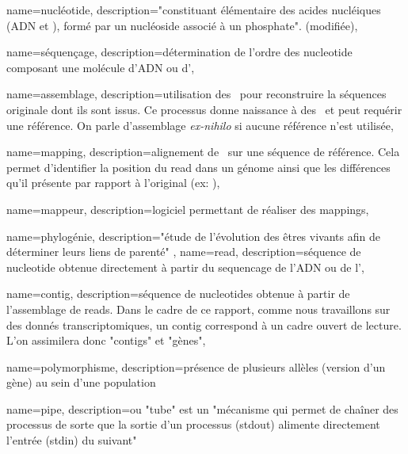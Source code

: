  {
    name=nucléotide,
    description={"constituant élémentaire des acides nucléiques (ADN et \ARN), formé par un nucléoside associé à un phosphate". \cite{Robert} (modifiée)},
}


 {
    name=séquençage,
    description={détermination de l'ordre des \gls{nucleotide} composant une molécule d'ADN ou d'\ARN},
}

 {
    name=assemblage,
    description={utilisation des \reads pour reconstruire la séquences originale dont ils sont issus. Ce processus donne naissance à des \contigs et peut requérir une référence. On parle d'assemblage \textit{ex-nihilo} si aucune référence n'est utilisée},
}

 {
    name=mapping,
    description={alignement de \reads sur une séquence de référence. Cela permet d'identifier la position du \gls{read} dans un génome ainsi que les différences qu'il présente par rapport à l'original (ex: \SNP)},
}

 {
    name=mappeur,
    description={logiciel permettant de réaliser des \glspl{mapping}},
}

 {
    name=phylogénie,
    description={"étude de l’évolution des êtres vivants afin de déterminer leurs liens de parenté" \cite{LeDico}},
}
 {
    name=read,
    description={séquence de \gls{nucleotide} obtenue directement à partir du \gls{sequencage} de l'ADN ou de l'\ARN},
}
\newcommand{\reads}{\glspl{read}}

 {
    name=contig,
    description={séquence de \glspl{nucleotide} obtenue à partir de l'\gls{assemblage} de \reads. Dans le cadre de ce rapport, comme nous travaillons sur des donnés \glspl{transcriptomique}, un \gls{contig} correspond à un cadre ouvert de lecture. L'on assimilera donc "contigs" et "gènes"},
}
\newcommand{\contig}{\gls{contig}}
\newcommand{\contigs}{\glspl{contig}}

 {
    name=polymorphisme,
    description={présence de plusieurs allèles (version d'un gène) au sein d'une population}
}


 {
    name=pipe,
    description={ou "tube" est un "mécanisme qui permet de chaîner des processus de sorte que la sortie d'un processus (stdout) alimente directement l'entrée (stdin) du suivant" \cite{LeDico}}
}
\newcommand{\pipe}{\gls{pipe}}

